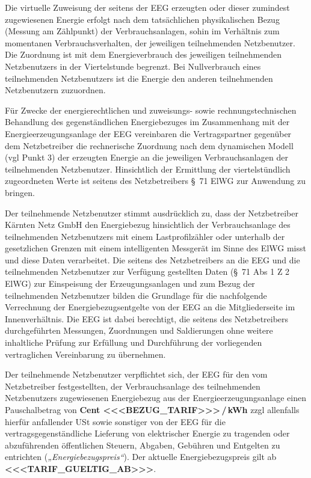 \documentclass[a4paper,11pt]{article}
\begin{document}

Die virtuelle Zuweisung der seitens der EEG erzeugten oder dieser zumindest zugewiesenen Energie erfolgt nach dem tatsächlichen physikalischen Bezug (Messung am Zählpunkt) der Verbrauchsanlagen, sohin im Verhältnis zum momentanen Verbrauchsverhalten, der jeweiligen teilnehmenden Netzbenutzer. Die Zuordnung ist mit dem Energieverbrauch des jeweiligen teilnehmenden Netzbenutzers in der Viertelstunde begrenzt. Bei Nullverbrauch eines teilnehmenden Netzbenutzers ist die Energie den anderen teilnehmenden Netzbenutzern zuzuordnen.

Für Zwecke der energierechtlichen und zuweisungs- sowie rechnungstechnischen Behandlung des gegenständlichen Energiebezuges im Zusammenhang mit der Energieerzeugungsanlage der EEG vereinbaren die Vertragspartner gegenüber dem Netzbetreiber die rechnerische Zuordnung nach dem dynamischen Modell (vgl Punkt 3) der erzeugten Energie an die jeweiligen Verbrauchsanlagen der teilnehmenden Netzbenutzer. Hinsichtlich der Ermittlung der viertelstündlich zugeordneten Werte ist seitens des Netzbetreibers \S\ 71 ElWG zur Anwendung zu bringen.

Der teilnehmende Netzbenutzer stimmt ausdrücklich zu, dass der Netzbetreiber Kärnten Netz GmbH den Energiebezug hinsichtlich der Verbrauchsanlage des teilnehmenden Netzbenutzers mit einem Lastprofilzähler oder unterhalb der gesetzlichen Grenzen mit einem intelligenten Messgerät im Sinne des ElWG misst und diese Daten verarbeitet. Die seitens des Netzbetreibers an die EEG und die teilnehmenden Netzbenutzer zur Verfügung gestellten Daten (\S\ 71 Abs 1 Z 2 ElWG) zur Einspeisung der Erzeugungsanlagen und zum Bezug der teilnehmenden Netzbenutzer bilden die Grundlage für die nachfolgende Verrechnung der Energiebezugsentgelte von der EEG an die Mitgliederseite im Innenverhältnis. Die EEG ist dabei berechtigt, die seitens des Netzbetreibers durchgeführten Messungen, Zuordnungen und Saldierungen ohne weitere inhaltliche Prüfung zur Erfüllung und Durchführung der vorliegenden vertraglichen Vereinbarung zu übernehmen.

Der teilnehmende Netzbenutzer verpflichtet sich, der EEG für den vom Netzbetreiber festgestellten, der Verbrauchsanlage des teilnehmenden Netzbenutzers zugewiesenen Energiebezug aus der Energieerzeugungsanlage einen Pauschalbetrag von \textbf{Cent <<<BEZUG_TARIF>>>\,/\,kWh} zzgl allenfalls hierfür anfallender USt sowie sonstiger von der EEG für die vertragsgegenständliche Lieferung von elektrischer Energie zu tragenden oder abzuführenden öffentlichen Steuern, Abgaben, Gebühren und Entgelten zu entrichten (\emph{„Energiebezugspreis“}). Der aktuelle Energiebezugspreis gilt ab \textbf{<<<TARIF_GUELTIG_AB>>>}.
\end{document}
